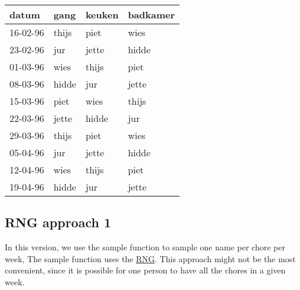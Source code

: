 \documentclass[openany]{book}
\begin{document}
\begin{tabular}{l|l|l|l}
\hline
datum & gang & keuken & badkamer\\
\hline
16-02-96 & thijs & piet & wies\\
\hline
23-02-96 & jur & jette & hidde\\
\hline
01-03-96 & wies & thijs & piet\\
\hline
08-03-96 & hidde & jur & jette\\
\hline
15-03-96 & piet & wies & thijs\\
\hline
22-03-96 & jette & hidde & jur\\
\hline
29-03-96 & thijs & piet & wies\\
\hline
05-04-96 & jur & jette & hidde\\
\hline
12-04-96 & wies & thijs & piet\\
\hline
19-04-96 & hidde & jur & jette\\
\hline
\end{tabular}

\hypertarget{rng-approach-1}{%
\subsection*{RNG approach 1}\label{rng-approach-1}}

In this version, we use the sample function to sample one name per chore per week, The sample function uses the \protect\hyperlink{rng}{RNG}. This approach might not be the most convenient, since it is possible for one person to have all the chores in a given week.
\end{document}
